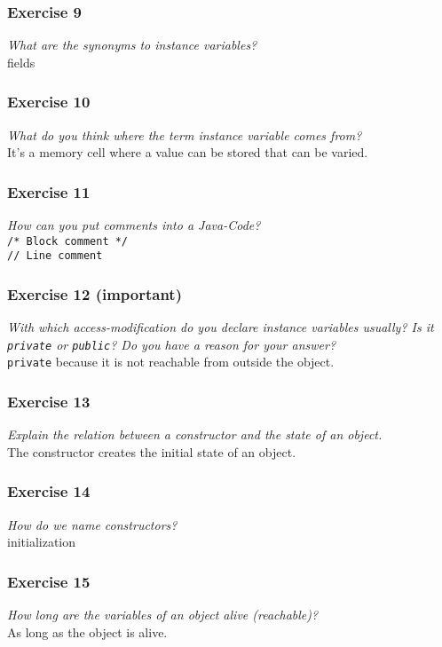 \subsubsection*{Exercise 9}
\textit{What are the synonyms to instance variables?}\\
fields

\subsubsection*{Exercise 10}
\textit{What do you think where the term instance variable comes from?}\\
It's a memory cell where a value can be stored that can be varied. 

\subsubsection*{Exercise 11}
\textit{How can you put comments into a Java-Code?}\\
\lstinline{/* Block comment */}\\
\lstinline{// Line comment}

\subsubsection*{Exercise 12 (important)}
\textit{With which access-modification do you declare instance variables
	usually? Is it \lstinline{private} or \lstinline{public}? Do you
	have a reason for your answer?}\\
\lstinline{private} because it is not reachable from outside the object. 

\subsubsection*{Exercise 13}
\textit{Explain the relation between a constructor and the state of an 
	object.}\\
The constructor creates the initial state of an object. 

\subsubsection*{Exercise 14}
\textit{How do we name constructors?}\\
initialization

\subsubsection*{Exercise 15}
\textit{How long are the variables of an object alive (reachable)?}\\
As long as the object is alive. 

